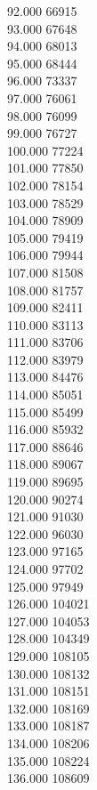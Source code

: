 { 92.000	66915 \\
 93.000	67648 \\
 94.000	68013 \\
 95.000	68444 \\
 96.000	73337 \\
 97.000	76061 \\
 98.000	76099 \\
 99.000	76727 \\
 100.000	77224 \\
 101.000	77850 \\
 102.000	78154 \\
 103.000	78529 \\
 104.000	78909 \\
 105.000	79419 \\
 106.000	79944 \\
 107.000	81508 \\
 108.000	81757 \\
 109.000	82411 \\
 110.000	83113 \\
 111.000	83706 \\
 112.000	83979 \\
 113.000	84476 \\
 114.000	85051 \\
 115.000	85499 \\
 116.000	85932 \\
 117.000	88646 \\
 118.000	89067 \\
 119.000	89695 \\
 120.000	90274 \\
 121.000	91030 \\
 122.000	96030 \\
 123.000	97165 \\
 124.000	97702 \\
 125.000	97949 \\
 126.000	104021 \\
 127.000	104053 \\
 128.000	104349 \\
 129.000	108105 \\
 130.000	108132 \\
 131.000	108151 \\
 132.000	108169 \\
 133.000	108187 \\
 134.000	108206 \\
 135.000	108224 \\
 136.000	108609 \\
}
